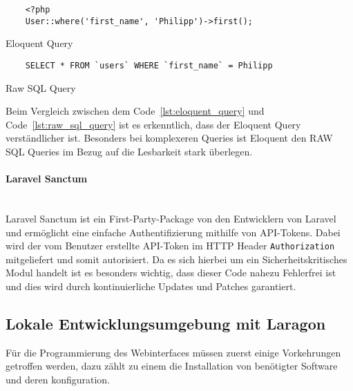 \begin{listing}[H]
  \begin{verbatim}
    <?php
    User::where('first_name', 'Philipp')->first();
  \end{verbatim}
  \caption{Eloquent Query}
  \label{lst:eloquent_query}
\end{listing}

\begin{listing}[H]
  \begin{verbatim}
    SELECT * FROM `users` WHERE `first_name` = Philipp
  \end{verbatim}
  \caption{Raw SQL Query}
  \label{lst:raw_sql_query}
\end{listing}

Beim Vergleich zwischen dem Code~\ref{lst:eloquent_query} und
Code~\ref{lst:raw_sql_query} ist es erkenntlich, dass der Eloquent Query
verständlicher ist. Besonders bei komplexeren Queries ist Eloquent den RAW
\acs*{SQL} Queries im Bezug auf die Lesbarkeit stark überlegen.


\paragraph{Laravel Sanctum}\mbox{}\\
Laravel Sanctum ist ein First-Party-Package von den Entwicklern von Laravel und
ermöglicht eine einfache Authentifizierung mithilfe von API-Tokens. Dabei wird
der vom Benutzer erstellte API-Token im HTTP Header \verb|Authorization|
mitgeliefert und somit autorisiert. Da es sich hierbei um ein
Sicherheitskritisches Modul handelt ist es besonders wichtig, dass dieser Code
nahezu Fehlerfrei ist und dies wird durch kontinuierliche Updates und Patches garantiert.
 


\subsection{Lokale Entwicklungsumgebung mit Laragon}
Für die Programmierung des Webinterfaces müssen zuerst einige Vorkehrungen
getroffen werden, dazu zählt zu einem die Installation von benötigter Software
und deren konfiguration.



